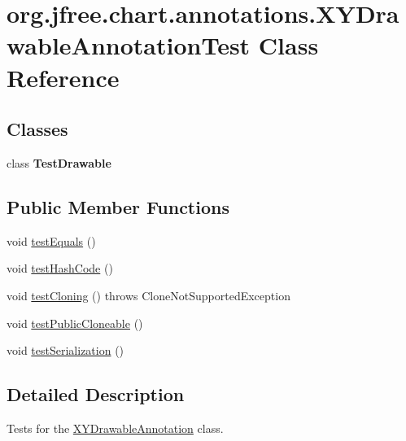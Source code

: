 \hypertarget{classorg_1_1jfree_1_1chart_1_1annotations_1_1_x_y_drawable_annotation_test}{}\section{org.\+jfree.\+chart.\+annotations.\+X\+Y\+Drawable\+Annotation\+Test Class Reference}
\label{classorg_1_1jfree_1_1chart_1_1annotations_1_1_x_y_drawable_annotation_test}
\subsection*{Classes}
\begin{DoxyCompactItemize}
\item 
class {\bfseries Test\+Drawable}
\end{DoxyCompactItemize}
\subsection*{Public Member Functions}
\begin{DoxyCompactItemize}
\item 
void \mbox{\hyperlink{classorg_1_1jfree_1_1chart_1_1annotations_1_1_x_y_drawable_annotation_test_a0dbe222be717e563c495efa9dcfb66b1}{test\+Equals}} ()
\item 
void \mbox{\hyperlink{classorg_1_1jfree_1_1chart_1_1annotations_1_1_x_y_drawable_annotation_test_a457a36b61d03a31dfd1a55d55c14465b}{test\+Hash\+Code}} ()
\item 
void \mbox{\hyperlink{classorg_1_1jfree_1_1chart_1_1annotations_1_1_x_y_drawable_annotation_test_a767eefc30d52284e04599c051ac7277d}{test\+Cloning}} ()  throws Clone\+Not\+Supported\+Exception 
\item 
void \mbox{\hyperlink{classorg_1_1jfree_1_1chart_1_1annotations_1_1_x_y_drawable_annotation_test_acd99e3f0436e651d81a83045a1fa0d31}{test\+Public\+Cloneable}} ()
\item 
void \mbox{\hyperlink{classorg_1_1jfree_1_1chart_1_1annotations_1_1_x_y_drawable_annotation_test_ad1b5c3b8fd869e3c3ba6bd86aee8bfa8}{test\+Serialization}} ()
\end{DoxyCompactItemize}


\subsection{Detailed Description}
Tests for the \mbox{\hyperlink{classorg_1_1jfree_1_1chart_1_1annotations_1_1_x_y_drawable_annotation}{X\+Y\+Drawable\+Annotation}} class. 

